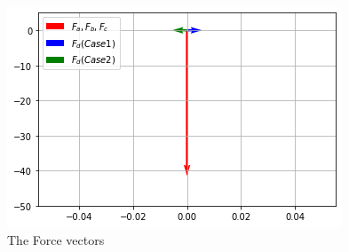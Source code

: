 \documentclass[journal,12pt,twocolumn]{IEEEtran}
\begin{document}
\begin{figure}[!ht]
\centering
\includegraphics[width=\columnwidth]{figure7}
\caption{The Force vectors }
\label{fig:vectors}	
\end{figure}
\end{document}
